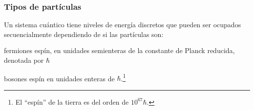 \documentclass[%
xcolor=pdftex,dvipsnames,table%
]{beamer}
\begin{document}
{
\begin{frame}[plain]
\end{frame}
}
{
\begin{frame}[plain]
\end{frame}
}
\begin{frame}
  \frametitle{Tipos de partículas}
  Un sistema cuántico  tiene niveles de energía discretos que pueden ser ocupados secuencialmente dependiendo de si las partículas son:
  \begin{block}{fermiones}
    espín, en unidades semienteras de la constante de Planck reducida, denotada por $\hbar$
  \end{block}
  \begin{block}{bosones}
    espín en unidades enteras de $\hbar$.\footnote{El ``espín'' de la tierra es del orden de $10^{67}\hbar$.}
  \end{block}

\end{frame}
\end{document}
